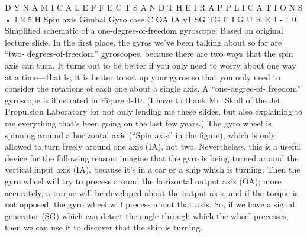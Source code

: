 \documentclass[10pt,oneside]{article}
\begin{document}
D Y N A M I C A L  E F F E C T S  A N D  T H E I R  A P P L I C A T I O N S • 1 2 5 H Spin axis Gimbal Gyro case C OA IA v1 SG TG F I G U R E  4 - 1 0 Simplified schematic of a one-degree-of-freedom gyroscope. Based on original lecture slide. In the first place, the gyros we’ve been talking about so far are “two- degrees-of-freedom” gyroscopes, because there are two ways that the spin axis can turn. It turns out to be better if you only need to worry about one way at a time---that is, it is better to set up your gyros so that you only need to consider the rotations of each one about a single axis. A “one-degree-of- freedom” gyroscope is illustrated in Figure 4-10. (I have to thank Mr. Skull of the Jet Propulsion Laboratory for not only lending me these slides, but also explaining to me everything that’s been going on the last few years.) The gyro wheel is spinning around a horizontal axis (“Spin axis” in the figure), which is only allowed to turn freely around one axis (IA), not two. Nevertheless, this is a useful device for the following reason: imagine that the gyro is being turned around the vertical input axis (IA), because it’s in a car or a ship which is turning. Then the gyro wheel will try to precess around the horizontal output axis (OA); more accurately, a torque will be developed about the output axis, and if the torque is not opposed, the gyro wheel will precess about that axis. So, if we have a signal generator (SG) which can detect the angle through which the wheel precesses, then we can use it to discover that the ship is turning.\par
\end{document}
